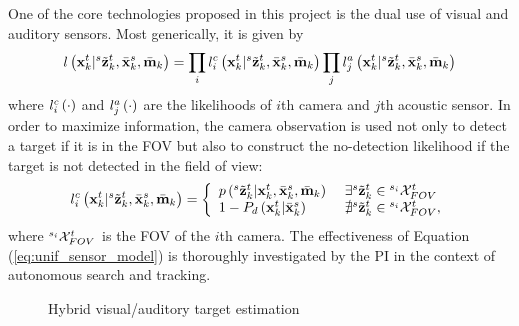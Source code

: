 \documentclass[letterpaper, 10 pt, conference]{ieeeconf}  %
\begin{document}
One of the core technologies proposed in this project is the dual use of visual and auditory sensors.  Most generically, it is given by
\begin{equation}\label{eq:joint}
l \left ( \mathbf{x}_{k}^{t}|{}^{s}\tilde {\mathbf{z}}_{k}^{t},\bar {\mathbf{x}}_{k}^{s},\bar {\mathbf{m}}_{k} \right ) = \prod_i l_i^{c} \left ( \mathbf{x}_{k}^{t}|{}^{s}\tilde {\mathbf{z}}_{k}^{t},\bar {\mathbf{x}}_{k}^{s},\bar {\mathbf{m}}_{k} \right ) \prod_j l_j^{a} \left ( \mathbf{x}_{k}^{t}|{}^{s}\tilde {\mathbf{z}}_{k}^{t},\bar {\mathbf{x}}_{k}^{s},\bar {\mathbf{m}}_{k} \right ) 
\end{equation}
where $l_i^{c} \left ( \cdot \right )$ and $l_j^{a} \left ( \cdot \right )$ are the likelihoods of $i$th camera and $j$th acoustic sensor.  In order to maximize information, the camera observation is used not only to detect a target if it is in the FOV but also to construct the no-detection likelihood if the target is not detected in the field of view:  
\begin{equation}\label{eq:unif_sensor_model}
l_i^{c} \left ( \mathbf{x}_{k}^{t}|{}^{s}\tilde {\mathbf{z}}_{k}^{t},\bar {\mathbf{x}}_{k}^{s},\bar {\mathbf{m}}_{k} \right ) = \left\{
\begin{array}{ll}
\mbox{$ {p} \left ( {}^{s}\tilde {\mathbf{z}}_{k}^{t}|\mathbf{x}_{k}^{t},\bar {\mathbf{x}}_{k}^{s},\bar {\mathbf{m}}_{k} \right )$ } & \exists {}^{s}\tilde {\mathbf{z}}_{k}^{t} \in {}^{s_i}\mathcal{X}_{FOV}^{t} \\
1 -  P_d\left ( \mathbf{x}_{k}^{t}|\bar {\mathbf{x}}_{k}^{s} \right ) & \nexists {}^{s}\tilde {\mathbf{z}}_{k}^{t} \in {}^{s_i}\mathcal{X}_{FOV}^{t},
\end{array}
\right.
\end{equation}
where ${}^{s_i}\mathcal{X}_{FOV}^{t}$ is the FOV of the $i$th camera.  The effectiveness of Equation (\ref{eq:unif_sensor_model}) is thoroughly investigated by the PI in the context of autonomous search and tracking.  


\begin{figure}[ht]
	\centering
	\caption{Hybrid visual/auditory target estimation}
	\label{fig:hybrid}
\end{figure}
\end{document}
